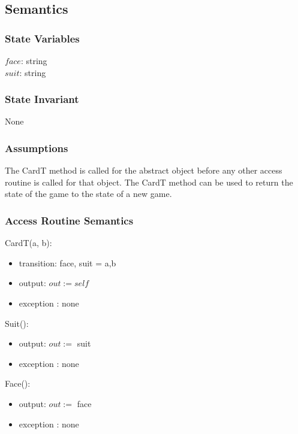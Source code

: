\documentclass[12pt]{article}
\begin{document}
\subsection* {Semantics}

\subsubsection* {State Variables}

$face$: string\\
$suit$: string\\


\subsubsection* {State Invariant}

None

\subsubsection* {Assumptions}

The CardT method is called for the abstract object before any other access routine is called for that
object.  The CardT method can be used to return the state of the game to the state of a new game.

\subsubsection* {Access Routine Semantics}

CardT(a, b):
\begin{itemize}
\item transition: 
 face, suit = a,b
\item output:
 $out := \mathit{self}$
\item exception :
none

\end{itemize}

Suit():
\begin{itemize}
\item output: 
$out :=$  suit
\item exception :
none
\end{itemize}

Face():
\begin{itemize}
	\item output: 
	$out :=$ face
	\item exception :
	none
\end{itemize}
\end{document}
